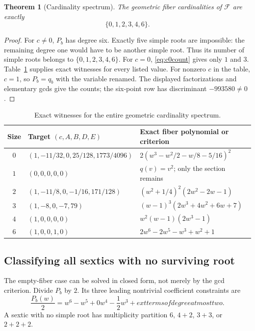 \documentclass[11pt,a4paper]{article}
\newtheorem{theorem}{Theorem}[section]
\theoremstyle{definition}
\newcommand{\F}{\mathcal F}
\begin{document}
\begin{theorem}[Cardinality spectrum]\label{thm:spectrum}
The geometric fiber cardinalities of $\F$ are exactly
\[
 \boxed{\{0,1,2,3,4,6\}.}
\]
\end{theorem}
\begin{proof}
For $c\ne0$, $P_b$ has degree six. Exactly five simple roots are
impossible: the remaining degree one would have to be another simple
root. Thus its number of simple roots belongs to
$\{0,1,2,3,4,6\}$. For $c=0$, \eqref{eq:c0count} gives only $1$ and $3$.
Table~\ref{tab:witness} supplies exact witnesses for every listed value.
For nonzero $c$ in the table, $c=1$, so $P_b=q_b$ with the variable
renamed. The displayed factorizations and elementary gcds give the
counts; the six-point row has discriminant $-993580\ne0$.
\end{proof}

\begin{table}[htbp]
\centering\small
\renewcommand{\arraystretch}{1.4}
\begin{tabularx}{\textwidth}{@{}c>{\raggedright\arraybackslash}p{}X@{}}
\toprule
Size & Target $(c,A,B,D,E)$ & Exact fiber polynomial or criterion\\
\midrule
$0$ & $(1,-11/32,0,25/128,1773/4096)$ &
$2(w^3-w^2/2-w/8-5/16)^2$\\
$1$ & $(0,0,0,0,0)$ & $q(v)=v^2$; only the section remains\\
$2$ & $(1,-11/8,0,-1/16,171/128)$ &
$(w^2+1/4)^2(2w^2-2w-1)$\\
$3$ & $(1,-8,0,-7,79)$ &
$(w-1)^3(2w^3+4w^2+6w+7)$\\
$4$ & $(1,0,0,0,0)$ & $w^2(w-1)(2w^3-1)$\\
$6$ & $(1,0,0,1,0)$ & $2w^6-2w^5-w^3+w^2+1$\\
\bottomrule
\end{tabularx}
\caption{Exact witnesses for the entire geometric cardinality spectrum.}
\label{tab:witness}
\end{table}

\subsection{Classifying all sextics with no surviving root}
The empty-fiber case can be solved in closed form, not merely by the gcd
criterion. Divide $P_b$ by $2$. Its three leading nontrivial coefficient
constraints are
\begin{equation}\label{eq:fixedcoeff}
 \frac{P_b(w)}2=w^6-w^5+0w^4-\frac12w^3+	ext{terms of degree at most two}.
\end{equation}
A sextic with no simple root has multiplicity partition
$6$, $4+2$, $3+3$, or $2+2+2$.
\end{document}
